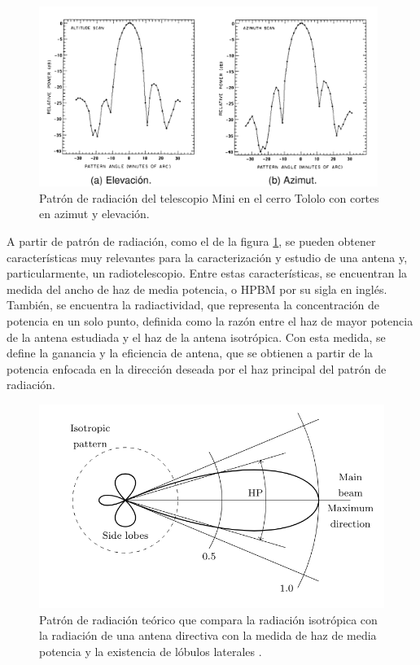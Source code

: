 \begin{figure}
    \centering
    \includegraphics[width = 11cm]{img/patern.png}
    \caption{Patrón de radiación del telescopio Mini en el cerro Tololo con cortes en azimut y elevación\cite{Astudillo2014}.}
    \label{fig:patern}
\end{figure}

A partir de patrón de radiación, como el de la figura \ref{fig:patern}, se pueden obtener características muy relevantes para la caracterización y estudio de una antena y, particularmente, un radiotelescopio. Entre estas características, se encuentran la medida del ancho de haz de media potencia, o HPBM por su sigla en inglés.\\

También, se encuentra la radiactividad, que representa la concentración de potencia en un solo punto, definida como la razón entre el haz de mayor potencia de la antena estudiada y el haz de la antena isotrópica. Con esta medida, se define la ganancia y la eficiencia de antena, que se obtienen a partir de la potencia enfocada en la dirección deseada por el haz principal del patrón de radiación.\\

\begin{figure}
    \centering
    \includegraphics[width = 15cm]{img/patern2.png}
    \caption{Patrón de radiación teórico que compara la radiación isotrópica con la radiación de una antena directiva con la medida de haz de media potencia y la existencia de lóbulos laterales \cite{Cassanelli2022}.}
    \label{fig:patern2}
\end{figure}

